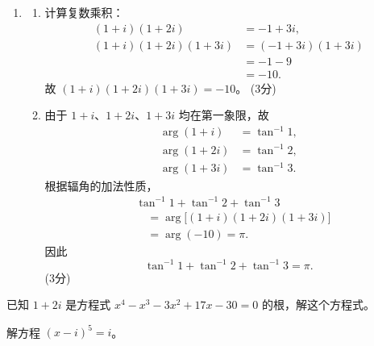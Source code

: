 \documentclass[12pt,a4paper]{exam-zh}
\newcommand{\qscore}[1]{%
    \unskip\nobreak\hfill
    \makebox[0pt][l]{\makebox[4em][r]{(#1\%)}}%
}
\begin{document}
\begin{solution}
\begin{enumerate}[label=(\alph*),leftmargin=2.4em,itemsep=1em,topsep=0.5em,parsep=0.25em]
        \item
        \begin{enumerate}[label=(\roman*),leftmargin=2.2em,itemsep=0.7em,topsep=0.35em]
            \item 计算复数乘积：
            \begin{align*}
                (1+i)(1+2i) &= -1+3i, \\
                (1+i)(1+2i)(1+3i)
                &=(-1+3i)(1+3i) \\
                &=-1-9 \\
                &=-10.
            \end{align*}
            故 $(1+i)(1+2i)(1+3i)=-10$。
            \hfill (3分)

            \item 由于 $1+i$、$1+2i$、$1+3i$ 均在第一象限，故
            \begin{align*}
                \arg(1+i)&=\tan^{-1}1, \\
                \arg(1+2i)&=\tan^{-1}2, \\
                \arg(1+3i)&=\tan^{-1}3.
            \end{align*}
            根据辐角的加法性质，
            \begin{align*}
                &\tan^{-1}1+\tan^{-1}2+\tan^{-1}3 \\
                &\quad=\arg\big[(1+i)(1+2i)(1+3i)\big] \\
                &\quad=\arg(-10)=\pi.
            \end{align*}
            因此
            \[
                \tan^{-1}1+\tan^{-1}2+\tan^{-1}3=\pi.
            \]
            \hfill (3分)
        \end{enumerate}
    \end{enumerate}
\end{solution}

\begin{question}[points = 12]
    \begin{questionparts}
        \item 已知 $1+2i$ 是方程式 $x^4-x^3-3x^2+17x-30=0$ 的根，解这个方程式。 \qscore{6}

        \item 解方程 $(x-i)^5=i$。 \qscore{6}
    \end{questionparts}
\end{question}
\end{document}
